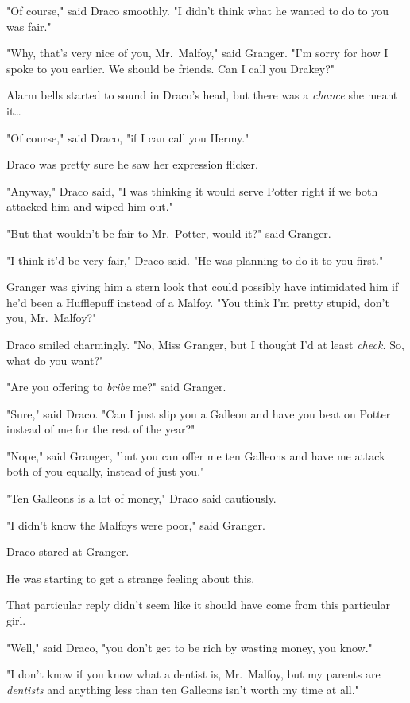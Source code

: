 "Of course," said Draco smoothly. "I didn't think what he wanted to do to you 
was fair."

"Why, that's very nice of you, Mr.~Malfoy," said Granger. "I'm sorry for how I 
spoke to you earlier. We should be friends. Can I call you Drakey?"

Alarm bells started to sound in Draco's head, but there was a \emph{chance} she 
meant it{\ldots}

"Of course," said Draco, "if I can call you Hermy."

Draco was pretty sure he saw her expression flicker.

"Anyway," Draco said, "I was thinking it would serve Potter right if we both 
attacked him and wiped him out."

"But that wouldn't be fair to Mr.~Potter, would it?" said Granger.

"I think it'd be very fair," Draco said. "He was planning to do it to you 
first."

Granger was giving him a stern look that could possibly have intimidated him if 
he'd been a Hufflepuff instead of a Malfoy. "You think I'm pretty stupid, don't 
you, Mr.~Malfoy?"

Draco smiled charmingly. "No, Miss Granger, but I thought I'd at least 
\emph{check.} So, what do you want?"

"Are you offering to \emph{bribe} me?" said Granger.

"Sure," said Draco. "Can I just slip you a Galleon and have you beat on Potter 
instead of me for the rest of the year?"

"Nope," said Granger, "but you can offer me ten Galleons and have me attack 
both of you equally, instead of just you."

"Ten Galleons is a lot of money," Draco said cautiously.

"I didn't know the Malfoys were poor," said Granger.

Draco stared at Granger.

He was starting to get a strange feeling about this.

That particular reply didn't seem like it should have come from this particular 
girl.

"Well," said Draco, "you don't get to be rich by wasting money, you know."

"I don't know if you know what a dentist is, Mr.~Malfoy, but my parents are 
\emph{dentists} and anything less than ten Galleons isn't worth my time at all."

